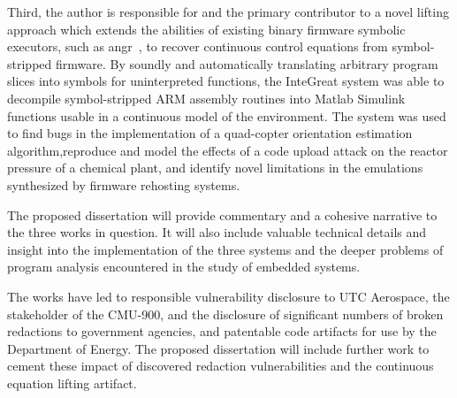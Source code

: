 \noindent
Third, the author is responsible for and the primary contributor to a novel lifting approach which extends the abilities of existing binary firmware symbolic executors, such as angr~\cite{wang2017angr}, to recover continuous control equations from symbol-stripped firmware.
By soundly and automatically translating arbitrary program slices into symbols for uninterpreted functions, the InteGreat system was able to decompile symbol-stripped ARM assembly routines into Matlab Simulink functions usable in a continuous model of the environment. 
The system was used to find bugs in the implementation of a quad-copter orientation estimation algorithm,reproduce and model the effects of a code upload attack on the reactor pressure of a chemical plant, and identify novel limitations in the emulations synthesized by firmware rehosting systems.


\noindent The proposed dissertation will provide commentary and a cohesive narrative to the three works in question. It will also include valuable technical details and insight into the implementation of the three systems and the deeper problems of program analysis encountered in the study of embedded systems.


\noindent The works have led to responsible vulnerability disclosure to UTC Aerospace, the stakeholder of the CMU-900, and the disclosure of significant numbers of broken redactions to government agencies, and patentable code artifacts for use by the Department of Energy. The proposed dissertation will include further work to cement these impact of discovered redaction vulnerabilities and the continuous equation lifting artifact.
